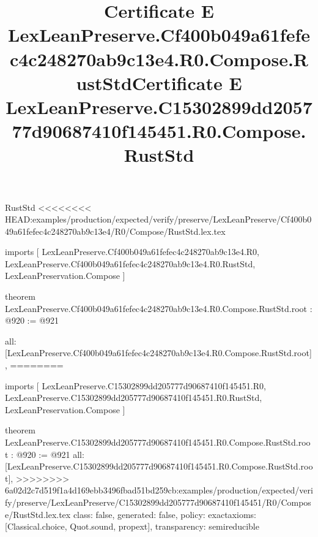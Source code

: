 \begin{lexlean}{RustStd}
<<<<<<<< HEAD:examples/production/expected/verify/preserve/LexLeanPreserve/Cf400b049a61fefec4c248270ab9c13e4/R0/Compose/RustStd.lex.tex
\title{Certificate E LexLeanPreserve.Cf400b049a61fefec4c248270ab9c13e4.R0.Compose.RustStd}
\begin{coremodule}
imports [
  LexLeanPreserve.Cf400b049a61fefec4c248270ab9c13e4.R0,
  LexLeanPreserve.Cf400b049a61fefec4c248270ab9c13e4.R0.RustStd,
  LexLeanPreservation.Compose
]

theorem LexLeanPreserve.Cf400b049a61fefec4c248270ab9c13e4.R0.Compose.RustStd.root : @920 := @921 {
  all: [LexLeanPreserve.Cf400b049a61fefec4c248270ab9c13e4.R0.Compose.RustStd.root],
========
\title{Certificate E LexLeanPreserve.C15302899dd205777d90687410f145451.R0.Compose.RustStd}
\begin{coremodule}
imports [
  LexLeanPreserve.C15302899dd205777d90687410f145451.R0,
  LexLeanPreserve.C15302899dd205777d90687410f145451.R0.RustStd,
  LexLeanPreservation.Compose
]

theorem LexLeanPreserve.C15302899dd205777d90687410f145451.R0.Compose.RustStd.root : @920 := @921 {
  all: [LexLeanPreserve.C15302899dd205777d90687410f145451.R0.Compose.RustStd.root],
>>>>>>>> 6a02d2c7d519f1a4d169ebb3496fbad51bd259cb:examples/production/expected/verify/preserve/LexLeanPreserve/C15302899dd205777d90687410f145451/R0/Compose/RustStd.lex.tex
  class: false,
  generated: false,
  policy: exact{axioms: [Classical.choice, Quot.sound, propext]},
  transparency: semireducible
}


\end{coremodule}}
\end{coremodule}
\end{lexlean}
